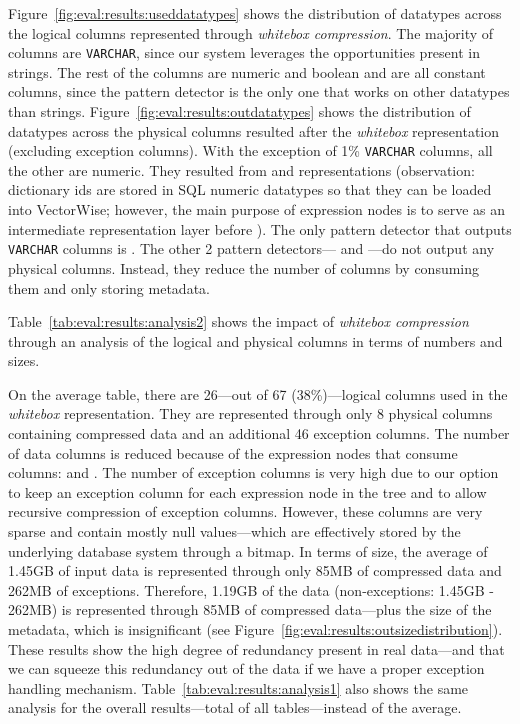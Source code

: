 Figure~\ref{fig:eval:results:useddatatypes} shows the distribution of datatypes across the logical columns represented through \textit{whitebox compression}. The majority of columns are \verb|VARCHAR|, since our system leverages the opportunities present in strings. The rest of the columns are numeric and boolean and are all constant columns, since the  pattern detector is the only one that works on other datatypes than strings. Figure~\ref{fig:eval:results:outdatatypes} shows the distribution of datatypes across the physical columns resulted after the \textit{whitebox} representation (excluding exception columns). With the exception of 1\% \verb|VARCHAR| columns, all the other are numeric. They resulted from  and  representations (observation: dictionary ids are stored in SQL numeric datatypes so that they can be loaded into VectorWise; however, the main purpose of  expression nodes is to serve as an intermediate representation layer before ). The only pattern detector that outputs \verb|VARCHAR| columns is . The other 2 pattern detectors--- and ---do not output any physical columns. Instead, they reduce the number of columns by consuming them and only storing metadata.

Table~\ref{tab:eval:results:analysis2} shows the impact of \textit{whitebox compression} through an analysis of the logical and physical columns in terms of numbers and sizes. 



On the average table, there are 26---out of 67 (38\%)---logical columns used in the \textit{whitebox} representation. They are represented through only 8 physical columns containing compressed data and an additional 46 exception columns. The number of data columns is reduced because of the expression nodes that consume columns:  and . The number of exception columns is very high due to our option to keep an exception column for each expression node in the tree and to allow recursive compression of exception columns. However, these columns are very sparse and contain mostly null values---which are effectively stored by the underlying database system through a bitmap. In terms of size, the average of 1.45GB of input data is represented through only 85MB of compressed data and 262MB of exceptions. Therefore, 1.19GB of the data (non-exceptions: 1.45GB - 262MB) is represented through 85MB of compressed data---plus the size of the metadata, which is insignificant (see Figure~\ref{fig:eval:results:outsizedistribution}). These results show the high degree of redundancy present in real data---and that we can squeeze this redundancy out of the data if we have a proper exception handling mechanism.
Table~\ref{tab:eval:results:analysis1} also shows the same analysis for the overall results---total of all tables---instead of the average.

